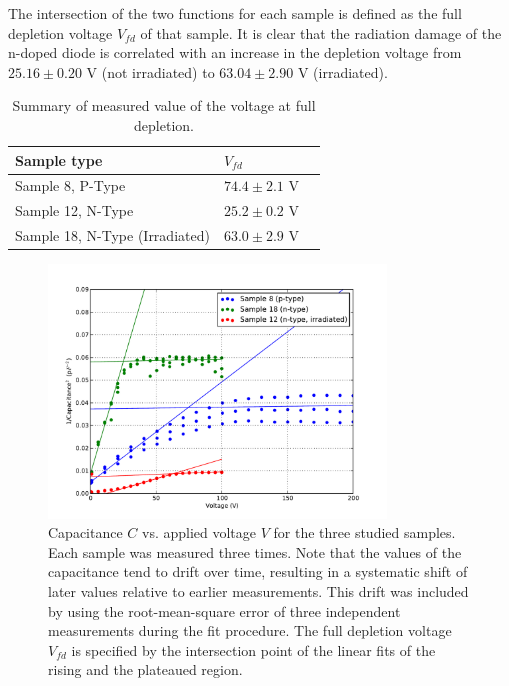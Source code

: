 \documentclass[11pt,a4paper]{report}
\begin{document}
The intersection of the two functions for each sample is defined as the full depletion voltage $V_{fd}$ of that sample.
It is clear that the radiation damage of the n-doped diode is correlated with an increase in the depletion voltage from $25.16\pm0.20$ V (not irradiated) to $63.04\pm2.90$ V (irradiated).


\begin{table}
  \caption{Summary of measured value of the voltage at full depletion.}\label{tab:results}
  \centering
  \begin{tabular}{lll}
    \toprule
    Sample type                    & $V_{fd}$  \\
    \midrule
    Sample 8, P-Type               & $74.4 \pm 2.1$ V       \\
    Sample 12, N-Type              & $25.2 \pm 0.2$ V      \\
    Sample 18, N-Type (Irradiated) & $63.0 \pm 2.9$ V      \\
    \bottomrule
  \end{tabular}
\end{table}



\label{sec:results}
\begin{figure}
  \centering
  \includegraphics[width=0.8\textwidth]{./figures/cv.pdf}  
  \caption{Capacitance $C$ vs. applied voltage $V$ for the three studied samples. Each sample was measured three times. Note that the values of the capacitance tend to drift over time, resulting in a systematic shift of later values relative to earlier measurements. This drift was included by using the root-mean-square error of three independent measurements during the fit procedure. The full depletion voltage $V_{fd}$ is specified by the intersection point of the linear fits of the rising and the plateaued region.}\label{fig:cv}
\end{figure}
\end{document}
